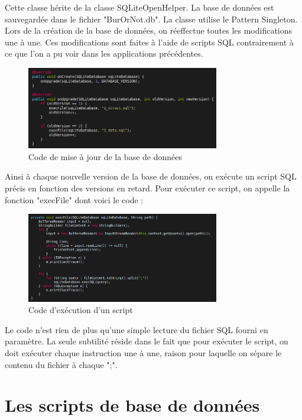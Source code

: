 \documentclass[report]{BetterDocument}
\newcommand{\bdd}{base de données}
\begin{document}
			Cette classe hérite de la classe SQLiteOpenHelper. La \bdd{} est sauvegardée dans le fichier "BurOrNot.db". La classe utilise le Pattern Singleton. Lors de la création de la \bdd{}, on réeffectue toutes les modifications une à une. Ces modifications sont faites à l'aide de scripts SQL contrairement à ce que l'on a pu voir dans les applications précédentes.

			\begin{figure}[H]
				\centering\includegraphics[width=0.75\textwidth, keepaspectratio]{img/bdd/maj_bdd.png}
				\caption{Code de mise à jour de la \bdd{}}
			\end{figure}

			Ainsi à chaque nouvelle version de la \bdd{}, on exécute un script SQL précis en fonction des versions en retard. Pour exécuter ce script, on appelle la fonction "execFile" dont voici le code :

			\begin{figure}[H]
				\centering\includegraphics[width=0.75\textwidth, keepaspectratio]{img/bdd/exec_script.png}
				\caption{Code d'exécution d'un script}
			\end{figure}

			Le code n'est rien de plus qu'une simple lecture du fichier SQL fourni en paramètre. La seule subtilité réside dans le fait que pour exécuter le script, on doit exécuter chaque instruction une à une, raison pour laquelle on sépare le contenu du fichier à chaque ";".

		\section{Les scripts de \bdd{}}
\end{document}
